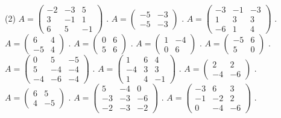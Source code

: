 \begin{tasks}(2)
\task $A = \begin{pmatrix} -2 & -3 & 5 \\ 3 & -1 & 1 \\ 6 & 5 & -1 \end{pmatrix}$ .
\task $A = \begin{pmatrix} -5 & -3 \\ -5 & -3 \end{pmatrix}$ .
\task $A = \begin{pmatrix} -3 & -1 & -3 \\ 1 & 3 & 3 \\ -6 & 1 & 4 \end{pmatrix}$ .
\task $A = \begin{pmatrix} 6 & 4 \\ -5 & 4 \end{pmatrix}$ .
\task $A = \begin{pmatrix} 0 & 6 \\ 5 & 6 \end{pmatrix}$ .
\task $A = \begin{pmatrix} 1 & -4 \\ 0 & 6 \end{pmatrix}$ .
\task $A = \begin{pmatrix} -5 & 6 \\ 5 & 0 \end{pmatrix}$ .
\task $A = \begin{pmatrix} 0 & 5 & -5 \\ 5 & -4 & -4 \\ -4 & -6 & -4 \end{pmatrix}$ .
\task $A = \begin{pmatrix} 1 & 6 & 4\\ -4 & 3 & 3 \\ 1 & 4 & -1 \end{pmatrix}$ .
\task $A = \begin{pmatrix} 2 & 2 \\ -4 & -6 \end{pmatrix}$ .
\task $A = \begin{pmatrix} 6 & 5 \\ 4 & -5 \end{pmatrix}$ .
\task $A = \begin{pmatrix} 5 & -4 & 0 \\ -3 & -3 & -6 \\ -2 & -3 & -2 \end{pmatrix}$ .
\task $A = \begin{pmatrix} -3 & 6 & 3 \\ -1 & -2 & 2 \\ 0 & -4 & -6 \end{pmatrix}$ .

\end{tasks}
